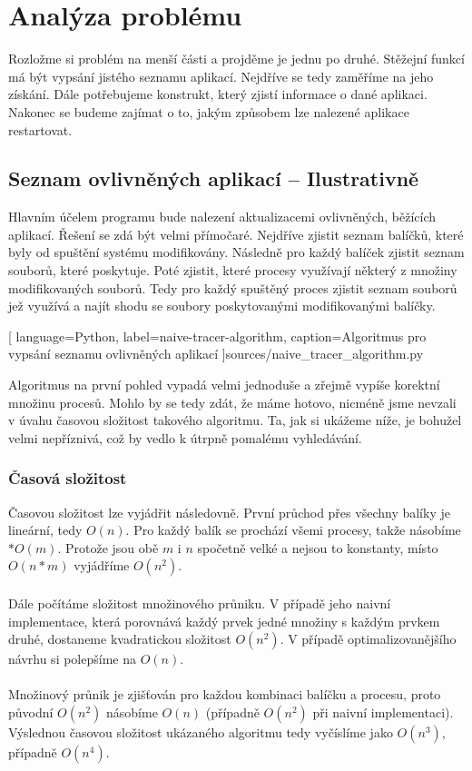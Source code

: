 \documentclass[10pt,a4paper]{article}
\begin{document}
	\section{Analýza problému}
	Rozložme si problém na menší části a projděme je jednu po druhé. Stěžejní funkcí má být vypsání jistého seznamu aplikací. Nejdříve se tedy zaměříme na jeho získání. Dále potřebujeme konstrukt, který zjistí informace o  dané aplikaci. Nakonec se budeme zajímat o to, jakým způsobem lze nalezené aplikace restartovat.

		\subsection{Seznam ovlivněných aplikací -- Ilustrativně}
		Hlavním účelem programu bude nalezení aktualizacemi ovlivněných, běžících aplikací. Řešení se zdá být velmi přímočaré. Nejdříve zjistit seznam balíčků, které byly od spuštění systému modifikovány. Následně pro každý balíček zjistit seznam souborů, které poskytuje. Poté zjistit, které procesy využívají některý z množiny modifikovaných souborů. Tedy pro každý spuštěný proces zjistit seznam souborů jež využívá a najít shodu se soubory poskytovanými modifikovanými balíčky.

		
		[
			language={Python},
			label=naive-tracer-algorithm,
			caption={Algoritmus pro vypsání seznamu ovlivněných aplikací}
		]{sources/naive_tracer_algorithm.py}

		Algoritmus na první pohled vypadá velmi jednoduše a zřejmě vypíše korektní množinu procesů. Mohlo by se tedy zdát, že máme hotovo, nicméně jsme nevzali v úvahu časovou složitost takového algoritmu. Ta, jak si ukážeme níže, je bohužel velmi nepříznivá, což by vedlo k útrpně pomalému vyhledávání.

			\subsubsection*{Časová složitost}
			Časovou složitost lze vyjádřit následovně. První průchod přes všechny balíky je lineární, tedy $O(n)$. Pro každý balík se prochází všemi procesy, takže násobíme $* O(m)$. Protože jsou obě $m$ i $n$ spočetně velké a nejsou to konstanty, místo $O(n*m)$ vyjádříme $O(n^2)$.
			\\
			\\
			Dále počítáme složitost množinového průniku. V případě jeho naivní implementace, která porovnává každý prvek jedné množiny s každým prvkem druhé, dostaneme kvadratickou složitost $O(n^2)$. V případě optimalizovanějšího návrhu si polepšíme na $O(n)$.
			\\
			\\
			Množinový průnik je zjišťován pro každou kombinaci balíčku a procesu, proto původní $O(n^2)$ násobíme $O(n)$ (případně $O(n^2)$ při naivní implementaci). Výslednou časovou složitost ukázaného algoritmu tedy vyčíslíme jako $O(n^3)$, případně $O(n^4)$.
\end{document}
